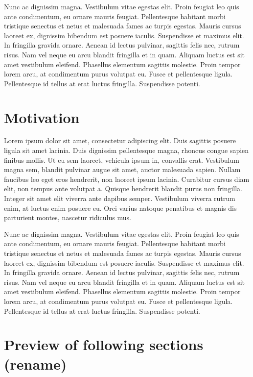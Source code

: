 \documentclass[
  a4paper,
  DIV=11,
  numbers=noendperiod]{scrreprt}
\theoremstyle{definition}
\theoremstyle{remark}
\begin{document}
Nunc ac dignissim magna. Vestibulum vitae egestas elit. Proin feugiat
leo quis ante condimentum, eu ornare mauris feugiat. Pellentesque
habitant morbi tristique senectus et netus et malesuada fames ac turpis
egestas. Mauris cursus laoreet ex, dignissim bibendum est posuere
iaculis. Suspendisse et maximus elit. In fringilla gravida ornare.
Aenean id lectus pulvinar, sagittis felis nec, rutrum risus. Nam vel
neque eu arcu blandit fringilla et in quam. Aliquam luctus est sit amet
vestibulum eleifend. Phasellus elementum sagittis molestie. Proin tempor
lorem arcu, at condimentum purus volutpat eu. Fusce et pellentesque
ligula. Pellentesque id tellus at erat luctus fringilla. Suspendisse
potenti.

\section{Motivation}\label{motivation}

Lorem ipsum dolor sit amet, consectetur adipiscing elit. Duis sagittis
posuere ligula sit amet lacinia. Duis dignissim pellentesque magna,
rhoncus congue sapien finibus mollis. Ut eu sem laoreet, vehicula ipsum
in, convallis erat. Vestibulum magna sem, blandit pulvinar augue sit
amet, auctor malesuada sapien. Nullam faucibus leo eget eros hendrerit,
non laoreet ipsum lacinia. Curabitur cursus diam elit, non tempus ante
volutpat a. Quisque hendrerit blandit purus non fringilla. Integer sit
amet elit viverra ante dapibus semper. Vestibulum viverra rutrum enim,
at luctus enim posuere eu. Orci varius natoque penatibus et magnis dis
parturient montes, nascetur ridiculus mus.

Nunc ac dignissim magna. Vestibulum vitae egestas elit. Proin feugiat
leo quis ante condimentum, eu ornare mauris feugiat. Pellentesque
habitant morbi tristique senectus et netus et malesuada fames ac turpis
egestas. Mauris cursus laoreet ex, dignissim bibendum est posuere
iaculis. Suspendisse et maximus elit. In fringilla gravida ornare.
Aenean id lectus pulvinar, sagittis felis nec, rutrum risus. Nam vel
neque eu arcu blandit fringilla et in quam. Aliquam luctus est sit amet
vestibulum eleifend. Phasellus elementum sagittis molestie. Proin tempor
lorem arcu, at condimentum purus volutpat eu. Fusce et pellentesque
ligula. Pellentesque id tellus at erat luctus fringilla. Suspendisse
potenti.

\autocite{perry2023}

\section{Preview of following sections
(rename)}\label{preview-of-following-sections-rename}
\end{document}
